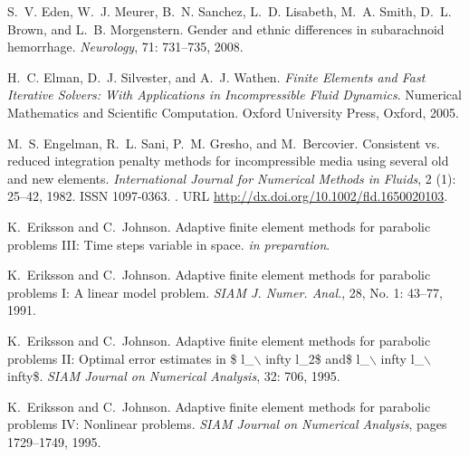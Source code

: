 \begin{thebibliography}{467}
S.~V. Eden, W.~J. Meurer, B.~N. Sanchez, L.~D. Lisabeth, M.~A. Smith, D.~L.
  Brown, and L.~B. Morgenstern.
\newblock Gender and ethnic differences in subarachnoid hemorrhage.
\newblock \emph{Neurology}, 71: 731--735, 2008.

H.~C. Elman, D.~J. Silvester, and A.~J. Wathen.
\newblock \emph{Finite Elements and Fast Iterative Solvers: With Applications
  in Incompressible Fluid Dynamics}.
\newblock Numerical Mathematics and Scientific Computation. Oxford University
  Press, Oxford, 2005.

M.~S. Engelman, R.~L. Sani, P.~M. Gresho, and M.~Bercovier.
\newblock Consistent vs. reduced integration penalty methods for incompressible
  media using several old and new elements.
\newblock \emph{International Journal for Numerical Methods in Fluids},
  2 (1): 25--42, 1982.
\newblock ISSN 1097-0363.
\newblock {}.
\newblock URL \url{http://dx.doi.org/10.1002/fld.1650020103}.

K.~Eriksson and C.~Johnson.
\newblock Adaptive finite element methods for parabolic problems {III}: {T}ime
  steps variable in space.
\newblock \emph{in preparation}.

K.~Eriksson and C.~Johnson.
\newblock Adaptive finite element methods for parabolic problems {I}: {A}
  linear model problem.
\newblock \emph{SIAM J. Numer. Anal.}, 28, No. 1: 43--77, 1991.

K.~Eriksson and C.~Johnson.
\newblock Adaptive finite element methods for parabolic problems {II}: Optimal
  error estimates in \$ l\_$\backslash$ infty l\_2\$ and\$ l\_$\backslash$
  infty l\_$\backslash$ infty\$.
\newblock \emph{SIAM Journal on Numerical Analysis}, 32: 706,
  1995{}.

K.~Eriksson and C.~Johnson.
\newblock Adaptive finite element methods for parabolic problems {IV}:
  Nonlinear problems.
\newblock \emph{SIAM Journal on Numerical Analysis}, pages 1729--1749,
  1995{}.


\end{thebibliography}

